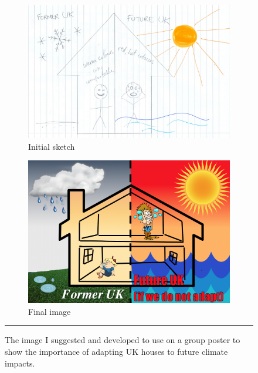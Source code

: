 \begin{figure}[htbp]
    \centering
        \begin{subfigure}{.49\textwidth}
          \centering
          \includegraphics[width=\textwidth]{figures/sketch.PNG}
          \caption{Initial sketch}
          \label{fig:Sketch01}
        \end{subfigure}
        \begin{subfigure}{.47\textwidth}
          \centering
          \includegraphics[width=\textwidth]{figures/eposter_sketch_2.png}
          \caption{Final image}
          \label{fig:Sketch02}
        \end{subfigure}
    \rule{\textwidth}{0.5pt} %
    \caption[\CCSA poster image.]{The image I suggested and developed to use on a group poster to show the importance of adapting UK houses to future climate impacts.}
    \label{fig:Sketch}
\end{figure}